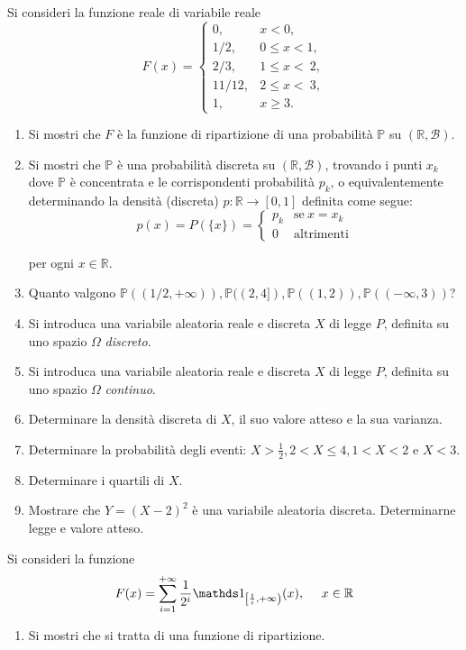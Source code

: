 Si consideri la funzione reale di variabile reale
\begin{equation*}
F( x) =\begin{cases}
0, & x< 0,\\
1/2, & 0\leq x< 1,\\
2/3, & 1\leq x< \ 2,\\
11/12, & 2\leq x< \ 3,\\
1, & x\geq 3.
\end{cases}
\end{equation*}
\begin{enumerate}
\item Si mostri che $F$ è la funzione di ripartizione di una probabilità $\mathbb{P}$ su $(\mathbb{R} ,\mathcal{B})$.
\item Si mostri che $\mathbb{P}$ è una probabilità discreta su $(\mathbb{R} ,\mathcal{B})$, trovando i punti $x_{k}$ dove $\mathbb{P}$ è concentrata e le corrispondenti probabilità $p_{k}$, o equivalentemente determinando la densità (discreta) $p:\mathbb{R}\rightarrow [ 0,1]$ definita come segue:\begin{equation*}
p( x) =P(\{x\}) =\begin{cases}
p_{k} & \text{se} \ x=x_{k}\\
0 & \text{altrimenti}
\end{cases}
\end{equation*}

per ogni $x\in \mathbb{R}$.
\item Quanto valgono $\mathbb{P}(( 1/2,+\infty )) ,\mathbb{P}(( 2,4]) ,\mathbb{P}(( 1,2)) ,\mathbb{P}(( -\infty ,3))$?
\item Si introduca una variabile aleatoria reale e discreta $X$ di legge $P$, definita su uno spazio $\Omega $ \textit{discreto}.
\item Si introduca una variabile aleatoria reale e discreta $X$ di legge $P$, definita su uno spazio $\Omega $ \textit{continuo}.
\item Determinare la densità discreta di $X$, il suo valore atteso e la sua varianza.
\item Determinare la probabilità degli eventi: $X >\frac{1}{2} ,2< X\leq 4,1< X< 2$ e $X< 3$.
\item Determinare i quartili di $X$.
\item Mostrare che $Y=( X-2)^{2}$ è una variabile aleatoria discreta. Determinarne legge e valore atteso.
\end{enumerate}
\Esercizio{}

Si consideri la funzione
\begin{equation*}
F( x) =\sum\limits _{i=1}^{+\infty }\frac{1}{2^{i}}\Ind_{\left[\frac{1}{i} ,+\infty \right)}( x) ,\ \ \ \ x\in \mathbb{R}
\end{equation*}
\begin{enumerate}
\item Si mostri che si tratta di una funzione di ripartizione.
\end{enumerate}


